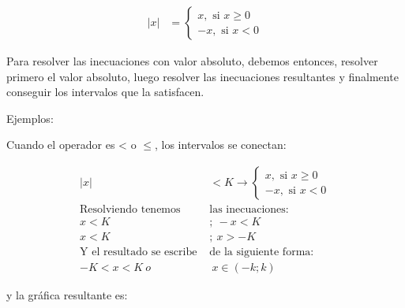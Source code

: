 \begin{align*}
    |x| &=
    \left\lbrace
    \begin{array}{c}
        x, \text{ si }x \geq0\\
        -x, \text{ si }x < 0
    \end{array}
    \right.
\end{align*}


    Para resolver las inecuaciones con valor absoluto, debemos entonces, resolver
    primero el valor absoluto, luego resolver las inecuaciones resultantes y
    finalmente conseguir los intervalos que la satisfacen.

    Ejemplos:

    Cuando el operador es < o $\leq$, los intervalos se conectan:

\begin{align*}
    |x| &<K \rightarrow
    \left\lbrace
    \begin{array}{c}
        x, \text{ si }x \geq0\\
        -x, \text{ si }x < 0
    \end{array}
    \right.\\
    \text{Resolviendo tenemos }& \text{las inecuaciones:}  \\
    x < K\ &; \ -x < K\\
    x < K\ &; \  x > -K\\
    \text{Y el resultado se escribe }& \text{de la siguiente forma:}\\
    -K < x < K\ o&\ x\in (-k;k)
\end{align*}

    y la gráfica resultante es:

    \vspace*{1cm}

